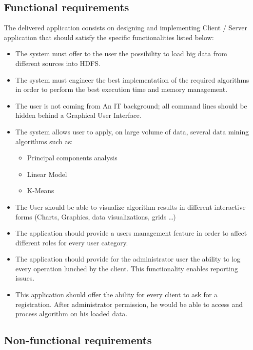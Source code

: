 \subsection{Functional requirements}

The delivered application consists on designing and implementing Client / Server application that should satisfy the specific functionalities listed below:
\begin{itemize}
\item The system must offer to the user the possibility to load big data from different sources into HDFS. 
\item The system must engineer the best implementation of the required algorithms in order to perform the best execution time and memory management.
\item The user is not coming from An IT background; all command lines should be hidden behind a Graphical User Interface. 
\item The system allows user to apply, on large volume of data, several data mining algorithms such as:
\begin{itemize}
\item Principal components analysis 
\item Linear Model
\item K-Means
\end{itemize}
\item The User should be able to visualize algorithm results in different interactive forms (Charts, Graphics, data visualizations, grids …)
\item The application should provide a users management feature in order to affect different roles for every user category.
\item The application should provide for the administrator user the ability to log every operation lunched by the client. This functionality enables reporting issues.
\item This application should offer the ability for every client to ask for a registration. After administrator permission, he would be able to access and process algorithm on his loaded data.
\end{itemize}
\subsection{Non-functional requirements}

